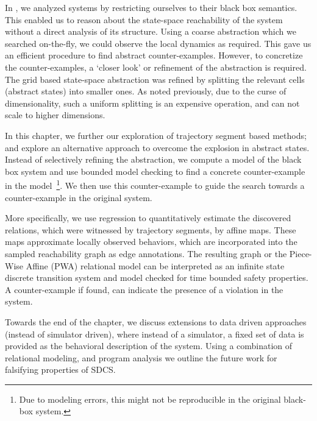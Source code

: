 


In , we analyzed systems by restricting ourselves to
their black box semantics. This enabled us to reason about the
state-space reachability of the system without a direct analysis of
its structure. Using a coarse abstraction which we searched
on-the-fly, we could observe the local dynamics as required. This gave
us an efficient procedure to find abstract counter-examples.  However,
to concretize the counter-examples, a `closer look' or refinement of
the abstraction is required. The grid based state-space abstraction
was refined by splitting the relevant cells (abstract states) into
smaller ones. As noted previously, due to the curse of dimensionality,
such a uniform splitting is an expensive operation, and can not scale to
higher dimensions.

In this chapter, we further our exploration of trajectory segment
based methods; and explore an alternative approach to overcome the
explosion in abstract states. Instead of selectively refining the
abstraction, we compute a model of the black box system and use
bounded model checking to find a concrete counter-example in the
model~\footnote{Due to modeling errors, this might not be reproducible in
the original black-box system.}. We then use this counter-example to
guide the search towards a counter-example in the original system.

More specifically, we use regression to quantitatively estimate the
discovered relations, which were witnessed by trajectory segments, by
affine maps. These maps approximate locally observed behaviors, which
are incorporated into the sampled reachability graph as edge
annotations.  The resulting graph or the Piece-Wise Affine (PWA)
relational model can be interpreted as an infinite state discrete
transition system and model checked for time bounded safety
properties. A counter-example if found, can indicate the presence of a
violation in the system.

Towards the end of the chapter, we discuss extensions to data driven
approaches (instead of simulator driven), where instead of a
simulator, a fixed set of data is provided as the behavioral
description of the system. Using a combination of relational modeling,
and program analysis we outline the future work for falsifying
properties of SDCS.

